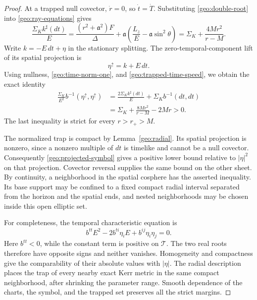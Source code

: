 \begin{proof}
At a trapped null covector, $\dot r=0$, so $\dot t=\dot T$.
Substituting \eqref{geo:double-root} into
\eqref{geo:ray-equations} gives
\begin{equation}
 \frac{\Sigma_K k^\sharp(dt)}{E}
   =\frac{(r^2+\mathfrak a^2)F}{\Delta}
        +\mathfrak a\left(\frac{L_z}{E}
                               -\mathfrak a\sin^2\theta\right)
   =\Sigma_K+\frac{4Mr^2}{r-M}.
 \label{geo:trapped-time-speed}
\end{equation}
Write $k=-E\,dt+\eta$ in the stationary splitting.  The
zero-temporal-component lift of its spatial projection is
\[
 \eta^\uparrow=k+E\,dt.
\]
Using nullness, \eqref{geo:time-norm-one}, and
\eqref{geo:trapped-time-speed}, we obtain the exact identity
\begin{equation}
 \begin{aligned}
 \frac{\Sigma_K}{E^2}
       b^{-1}(\eta^\uparrow,\eta^\uparrow)
 &=\frac{2\Sigma_K k^\sharp(dt)}{E}
            +\Sigma_K b^{-1}(dt,dt)\\
 &=\Sigma_K+\frac{8Mr^2}{r-M}-2Mr>0.
 \end{aligned}
 \label{geo:projected-symbol}
\end{equation}
The last inequality is strict for every $r>r_+>M$.

The normalized trap is compact by Lemma~\ref{geo:radial}.
Its spatial projection is nonzero, since a nonzero multiple of
$dt$ is timelike and cannot be a null covector.  Consequently
\eqref{geo:projected-symbol} gives a positive lower bound relative
to $|\eta|^2$ on that projection.  Covector reversal supplies the
same bound on the other sheet.  By continuity, a neighborhood in
the spatial cosphere has the asserted inequality.  Its base
support may be confined to a fixed compact radial interval
separated from the horizon and the spatial ends, and nested
neighborhoods may be chosen inside this open elliptic set.

For completeness, the temporal characteristic equation is
\begin{equation}
 b^{tt}E^2-2b^{ti}\eta_i E+b^{ij}\eta_i\eta_j=0.
 \label{geo:temporal-roots}
\end{equation}
Here $b^{tt}<0$, while the constant term is positive on
$\mathcal T$.  The two real roots therefore have opposite signs
and neither vanishes.  Homogeneity and compactness give the
comparability of their absolute values with $|\eta|$.
The radial description places the trap of every nearby exact Kerr
metric in the same compact neighborhood, after shrinking the
parameter range.  Smooth dependence of the charts, the symbol,
and the trapped set preserves all the strict margins.
\end{proof}

